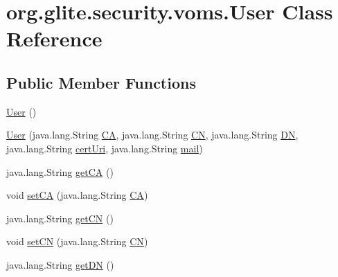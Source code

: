 \hypertarget{classorg_1_1glite_1_1security_1_1voms_1_1User}{
\section{org.glite.security.voms.User Class Reference}
\label{classorg_1_1glite_1_1security_1_1voms_1_1User}
}
\subsection*{Public Member Functions}
\begin{DoxyCompactItemize}
\item 
\hyperlink{classorg_1_1glite_1_1security_1_1voms_1_1User_ac77fa8f377a3661e4b49fbfa1c80aeca}{User} ()
\item 
\hyperlink{classorg_1_1glite_1_1security_1_1voms_1_1User_aa38d878a7846e6618db4a453f2e07ae0}{User} (java.lang.String \hyperlink{classorg_1_1glite_1_1security_1_1voms_1_1User_ac2357750b9b3d578955367ff914b07db}{CA}, java.lang.String \hyperlink{classorg_1_1glite_1_1security_1_1voms_1_1User_a21fdc685617e5e8e93eb94323986a57c}{CN}, java.lang.String \hyperlink{classorg_1_1glite_1_1security_1_1voms_1_1User_aa572a6fe0e875ec244c516a958d7a8e8}{DN}, java.lang.String \hyperlink{classorg_1_1glite_1_1security_1_1voms_1_1User_ae03c742ad5450dd97e611fa42eca5fb0}{certUri}, java.lang.String \hyperlink{classorg_1_1glite_1_1security_1_1voms_1_1User_a0929e9a6327b46a6196fd741c8d5d09c}{mail})
\item 
java.lang.String \hyperlink{classorg_1_1glite_1_1security_1_1voms_1_1User_a1627a505e6ec364b76a1c4c450d33d1a}{getCA} ()
\item 
void \hyperlink{classorg_1_1glite_1_1security_1_1voms_1_1User_a3cb21922588362827cfa791a5a697b06}{setCA} (java.lang.String \hyperlink{classorg_1_1glite_1_1security_1_1voms_1_1User_ac2357750b9b3d578955367ff914b07db}{CA})
\item 
java.lang.String \hyperlink{classorg_1_1glite_1_1security_1_1voms_1_1User_ae5866f4f6167bca6d5c13e4381254fa6}{getCN} ()
\item 
void \hyperlink{classorg_1_1glite_1_1security_1_1voms_1_1User_a791a526540914e5ffb0cd588188d8dd5}{setCN} (java.lang.String \hyperlink{classorg_1_1glite_1_1security_1_1voms_1_1User_a21fdc685617e5e8e93eb94323986a57c}{CN})
\item 
java.lang.String \hyperlink{classorg_1_1glite_1_1security_1_1voms_1_1User_a094592b884a13e068f2f46a8c9b43096}{getDN} ()
\item 

\end{DoxyCompactItemize}
